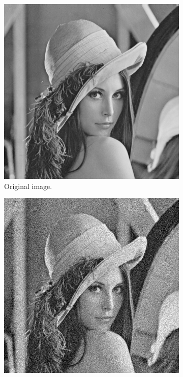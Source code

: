\documentclass[abstracton]{scrreprt}
\begin{document}
            \begin{figure}[!ht]
                \centering
                \begin{subfigure}[b]{0.3\textwidth}
                    \includegraphics[width=\textwidth]{img/images/lena.png}
                    \caption{Original image.}
                \end{subfigure}
                \begin{subfigure}[b]{0.3\textwidth}
                    \includegraphics[width=\textwidth]{img/images/lena_gauss_noise.png}

\end{subfigure}
\end{figure}
\end{document}
